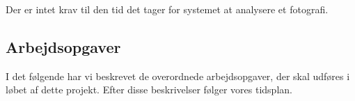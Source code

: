 
Der er intet krav til den tid det tager for systemet at analysere et fotografi.












	
\subsection*{Arbejdsopgaver}
I det følgende har vi beskrevet de overordnede arbejdsopgaver, der skal udføres i løbet af dette projekt. Efter disse beskrivelser følger vores tidsplan.

